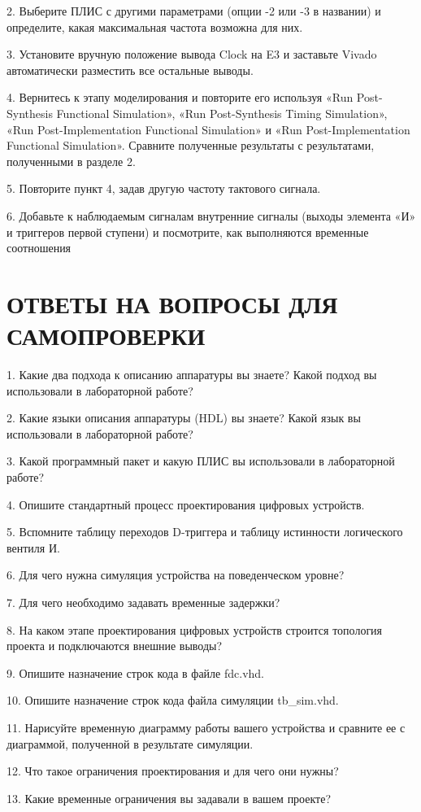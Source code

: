 \begin{sloppypar}
2. Выберите ПЛИС с другими параметрами (опции -2 или -3 в названии) и определите, какая максимальная частота возможна для них.


3. Установите вручную положение вывода Clock на E3 и заставьте Vivado автоматически разместить все остальные выводы.


4. Вернитесь к этапу моделирования и повторите его используя «Run Post-Synthesis Functional Simulation», «Run Post-Synthesis Timing Simulation», «Run Post-Implementation Functional Simulation» и «Run Post-Implementation Functional Simulation». Сравните полученные результаты с результатами, полученными в разделе 2.


5. Повторите пункт 4, задав другую частоту тактового сигнала.



6. Добавьте к наблюдаемым сигналам внутренние сигналы (выходы элемента «И» и триггеров первой ступени) и посмотрите, как выполняются временные соотношения









\section*{ОТВЕТЫ НА ВОПРОСЫ ДЛЯ САМОПРОВЕРКИ}

1. Какие два подхода к описанию аппаратуры вы знаете? Какой подход
вы использовали в лабораторной работе?


2. Какие языки описания аппаратуры (HDL) вы знаете? Какой язык вы
использовали в лабораторной работе?


3. Какой программный пакет и какую ПЛИС вы использовали в лабораторной работе?


4. Опишите стандартный процесс проектирования цифровых устройств.


5. Вспомните таблицу переходов D-триггера и таблицу истинности логического вентиля И.


6. Для чего нужна симуляция устройства на поведенческом уровне?


7. Для чего необходимо задавать временные задержки?


8. На каком этапе проектирования цифровых устройств строится топология проекта и подключаются внешние выводы?


9. Опишите назначение строк кода в файле fdc.vhd.


10. Опишите назначение строк кода файла симуляции tb\_sim.vhd.


11. Нарисуйте временную диаграмму работы вашего устройства и сравните ее с диаграммой, полученной в результате симуляции.


12. Что такое ограничения проектирования и для чего они нужны?


13. Какие временные ограничения вы задавали в вашем проекте?




% 
% 


\end{sloppypar}
